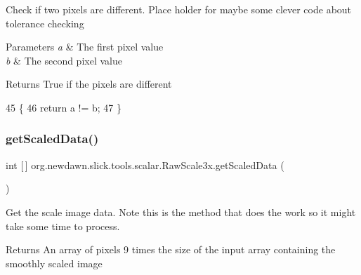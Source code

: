Check if two pixels are different. Place holder for maybe some clever code about tolerance checking


\begin{DoxyParams}{Parameters}
{\em a} & The first pixel value \\
\hline
{\em b} & The second pixel value \\
\hline
\end{DoxyParams}
\begin{DoxyReturn}{Returns}
True if the pixels are different 
\end{DoxyReturn}

\begin{DoxyCode}
45     \{
46         \textcolor{keywordflow}{return} a != b;
47     \}
\end{DoxyCode}
\mbox{\label{classorg_1_1newdawn_1_1slick_1_1tools_1_1scalar_1_1_raw_scale3x_ac70ed8797808739faa9b6376e7672c00}} 
\subsubsection{\texorpdfstring{get\+Scaled\+Data()}{getScaledData()}}
{\footnotesize\ttfamily int \mbox{[}$\,$\mbox{]} org.\+newdawn.\+slick.\+tools.\+scalar.\+Raw\+Scale3x.\+get\+Scaled\+Data (\begin{DoxyParamCaption}{ }\end{DoxyParamCaption})\hspace{0.3cm}{\ttfamily [inline]}}

Get the scale image data. Note this is the method that does the work so it might take some time to process.

\begin{DoxyReturn}{Returns}
An array of pixels 9 times the size of the input array containing the smoothly scaled image 
\end{DoxyReturn}

